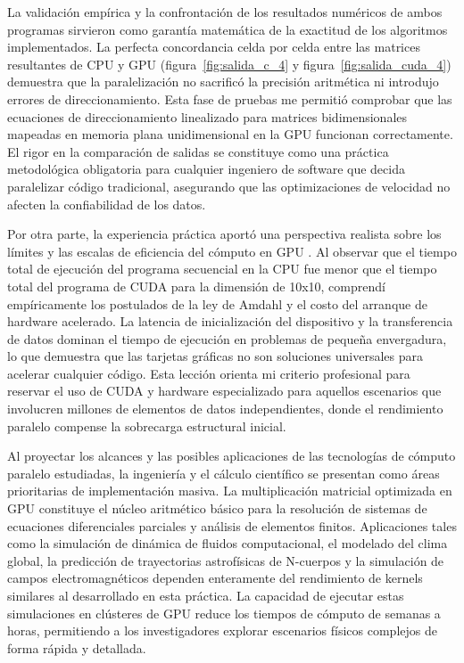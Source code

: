 La validación empírica y la confrontación de los resultados numéricos de ambos programas sirvieron como garantía matemática de la exactitud de los algoritmos implementados. La perfecta concordancia celda por celda entre las matrices resultantes de CPU y GPU (figura~\ref{fig:salida_c_4} y figura~\ref{fig:salida_cuda_4}) demuestra que la paralelización no sacrificó la precisión aritmética ni introdujo errores de direccionamiento. Esta fase de pruebas me permitió comprobar que las ecuaciones de direccionamiento linealizado para matrices bidimensionales mapeadas en memoria plana unidimensional en la GPU funcionan correctamente. El rigor en la comparación de salidas se constituye como una práctica metodológica obligatoria para cualquier ingeniero de software que decida paralelizar código tradicional, asegurando que las optimizaciones de velocidad no afecten la confiabilidad de los datos.

Por otra parte, la experiencia práctica aportó una perspectiva realista sobre los límites y las escalas de eficiencia del cómputo en GPU \cite{nvidiaBestPractices}. Al observar que el tiempo total de ejecución del programa secuencial en la CPU fue menor que el tiempo total del programa de CUDA para la dimensión de 10x10, comprendí empíricamente los postulados de la ley de Amdahl y el costo del arranque de hardware acelerado. La latencia de inicialización del dispositivo y la transferencia de datos dominan el tiempo de ejecución en problemas de pequeña envergadura, lo que demuestra que las tarjetas gráficas no son soluciones universales para acelerar cualquier código. Esta lección orienta mi criterio profesional para reservar el uso de CUDA y hardware especializado para aquellos escenarios que involucren millones de elementos de datos independientes, donde el rendimiento paralelo compense la sobrecarga estructural inicial.

Al proyectar los alcances y las posibles aplicaciones de las tecnologías de cómputo paralelo estudiadas, la ingeniería y el cálculo científico se presentan como áreas prioritarias de implementación masiva. La multiplicación matricial optimizada en GPU constituye el núcleo aritmético básico para la resolución de sistemas de ecuaciones diferenciales parciales y análisis de elementos finitos. Aplicaciones tales como la simulación de dinámica de fluidos computacional, el modelado del clima global, la predicción de trayectorias astrofísicas de N-cuerpos y la simulación de campos electromagnéticos dependen enteramente del rendimiento de kernels similares al desarrollado en esta práctica. La capacidad de ejecutar estas simulaciones en clústeres de GPU reduce los tiempos de cómputo de semanas a horas, permitiendo a los investigadores explorar escenarios físicos complejos de forma rápida y detallada.

